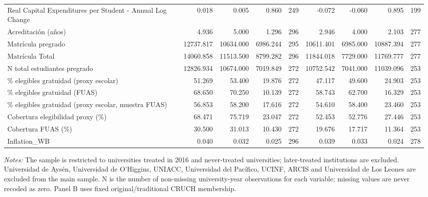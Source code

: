 \begin{table}[!htbp]
{\begin{tabular}{lrrrrrrrr}
Real Capital Expenditures per Student - Annual Log Change & 0.018 & 0.005 & 0.860 & 249 & -0.072 & -0.060 & 0.895 & 199 \\
Acreditación (años) & 4.936 & 5.000 & 1.296 & 296 & 2.946 & 4.000 & 2.103 & 277 \\
Matrícula pregrado & 12737.817 & 10634.000 & 6986.244 & 295 & 10611.401 & 6985.000 & 10887.394 & 277 \\
Matrícula Total & 14060.858 & 11513.500 & 8799.282 & 296 & 11844.018 & 7729.000 & 11769.777 & 277 \\
N total estudiantes pregrado & 12826.934 & 10674.000 & 7019.849 & 272 & 10752.542 & 7041.000 & 11039.096 & 253 \\
\% elegibles gratuidad (proxy escolar) & 51.269 & 53.400 & 19.876 & 272 & 47.117 & 49.600 & 24.903 & 253 \\
\% elegibles gratuidad (FUAS) & 68.650 & 70.250 & 10.139 & 272 & 58.743 & 62.700 & 16.329 & 253 \\
\% elegibles gratuidad (proxy escolar, muestra FUAS) & 56.853 & 58.200 & 17.616 & 272 & 54.610 & 58.400 & 23.460 & 253 \\
Cobertura elegibilidad proxy (\%) & 68.471 & 75.719 & 23.047 & 272 & 52.453 & 52.776 & 27.446 & 253 \\
Cobertura FUAS (\%) & 30.500 & 31.013 & 10.430 & 272 & 19.676 & 17.717 & 11.364 & 253 \\
Inflation\_WB & 0.040 & 0.032 & 0.025 & 296 & 0.039 & 0.033 & 0.024 & 278 \\
\bottomrule
\end{tabular}%
}
\begin{minipage}{0.98\textwidth}
\footnotesize \textit{Notes:} The sample is restricted to universities treated in 2016 and never-treated universities; later-treated institutions are excluded. Universidad de Aysén, Universidad de O'Higgins, UNIACC, Universidad del Pacífico, UCINF, ARCIS and Universidad de Los Leones are excluded from the main sample. N is the number of non-missing university-year observations for each variable; missing values are never recoded as zero. Panel B uses fixed original/traditional CRUCH membership.
\end{minipage}
\end{table}
